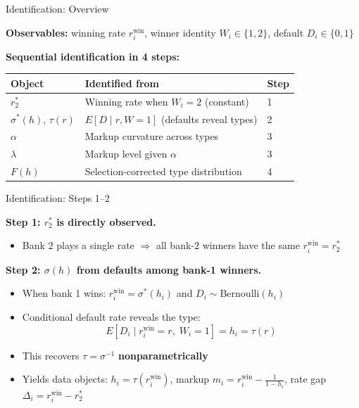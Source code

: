 \documentclass[10pt,aspectratio=169]{beamer}
\begin{document}
\begin{frame}{Identification: Overview}

\textbf{Observables:} winning rate $r_i^{\text{win}}$, winner identity $W_i \in \{1,2\}$, default $D_i \in \{0,1\}$

\vspace{0.2cm}
\textbf{Sequential identification in 4 steps:}

\begin{center}
\renewcommand{\arraystretch}{1.4}
\begin{tabular}{lll}
\toprule
\textbf{Object} & \textbf{Identified from} & \textbf{Step} \\
\midrule
$r_2^*$ & Winning rate when $W_i = 2$ (constant) & 1 \\
$\sigma^*(h)$, $\tau(r)$ & $E[D \mid r, W\!=\!1]$ (defaults reveal types) & 2 \\
$\alpha$ & Markup curvature across types & 3 \\
$\lambda$ & Markup level given $\alpha$ & 3 \\
$F(h)$ & Selection-corrected type distribution & 4 \\
\bottomrule
\end{tabular}
\end{center}

\end{frame}


\begin{frame}{Identification: Steps 1--2}

\textbf{Step 1: $r_2^*$ is directly observed.}
\begin{itemize}
    \item Bank 2 plays a single rate $\Rightarrow$ all bank-2 winners have the same $r_i^{\text{win}} = r_2^*$
\end{itemize}

\vspace{0.3cm}
\textbf{Step 2: $\sigma(h)$ from defaults among bank-1 winners.}
\begin{itemize}
    \item When bank 1 wins: $r_i^{\text{win}} = \sigma^*(h_i)$ and $D_i \sim \text{Bernoulli}(h_i)$
    \item Conditional default rate reveals the type:
    $$E[D_i \mid r_i^{\text{win}} = r, \; W_i = 1] = h_i = \tau(r)$$
    \item This recovers $\tau = \sigma^{-1}$ \textbf{nonparametrically}
    \item Yields data objects: $h_i = \tau(r_i^{\text{win}})$, markup $m_i = r_i^{\text{win}} - \frac{1}{1-h_i}$, rate gap $\Delta_i = r_i^{\text{win}} - r_2^*$
\end{itemize}

\end{frame}
\end{document}
